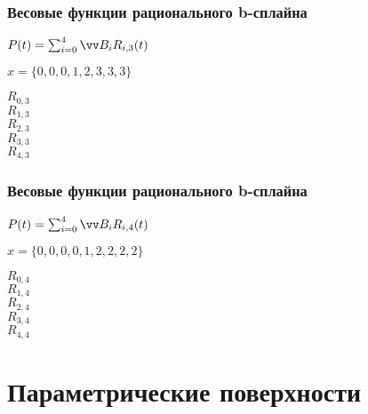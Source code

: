 \documentclass[10pt]{beamer}
\begin{document}
\begin{frame}\frametitle{Весовые функции рационального b-сплайна}
	
	\subtitle{3го-порядка}
	
	{
		
	}{
		$P (t)=\sum_{i=0}^{4}\vv B_iR_{i,3}(t)$
		
		$x=\{ 0,0,0,1,2,3,3,3\}$ 
		
		\begin{minipage}[b]{1cm}
			{\color{red}$R_{0,3}$}\\
			{\color{green}$R_{1,3}$}\\
			{\color{blue}$R_{2,3}$}\\
			{\color{Orange}$R_{3,3}$}\\
			{\color{Magenta}$R_{4,3}$}\\
		\end{minipage}

	}	
	
\end{frame}

\begin{frame}\frametitle{Весовые функции рационального b-сплайна}
	
	\subtitle{4го-порядка}
	
	{
		
	}{
		$P (t)=\sum_{i=0}^{4}\vv B_iR_{i,4}(t)$
		
		$x= \{ 0,0,0,0,1,2,2,2,2\}$
		
		\begin{minipage}[b]{1cm}		
			{\color{red}$R_{0,4}$}\\
			{\color{green}$R_{1,4}$}\\
			{\color{blue}$R_{2,4}$}\\
			{\color{Orange}$R_{3,4}$}\\
			{\color{Magenta}$R_{4,4}$}\\
		\end{minipage}
	}	
	
\end{frame}



\section{Параметрические поверхности}
\frame {\sectionpage}
\end{document}
